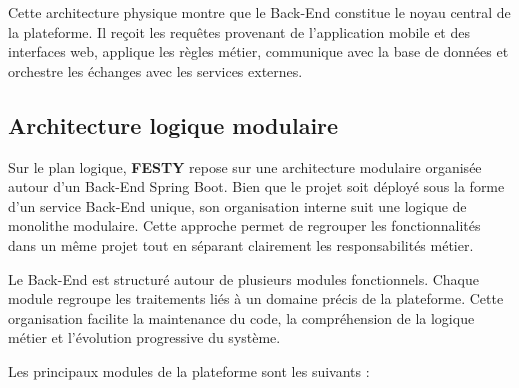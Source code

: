 Cette architecture physique montre que le Back-End constitue le noyau central de la plateforme. Il reçoit les requêtes provenant de l'application mobile et des interfaces web, applique les règles métier, communique avec la base de données et orchestre les échanges avec les services externes.

\subsection{Architecture logique modulaire}
Sur le plan logique, \textbf{FESTY} repose sur une architecture modulaire organisée autour d'un Back-End Spring Boot. Bien que le projet soit déployé sous la forme d'un service Back-End unique, son organisation interne suit une logique de monolithe modulaire. Cette approche permet de regrouper les fonctionnalités dans un même projet tout en séparant clairement les responsabilités métier.

Le Back-End est structuré autour de plusieurs modules fonctionnels. Chaque module regroupe les traitements liés à un domaine précis de la plateforme. Cette organisation facilite la maintenance du code, la compréhension de la logique métier et l'évolution progressive du système.

Les principaux modules de la plateforme sont les suivants :

